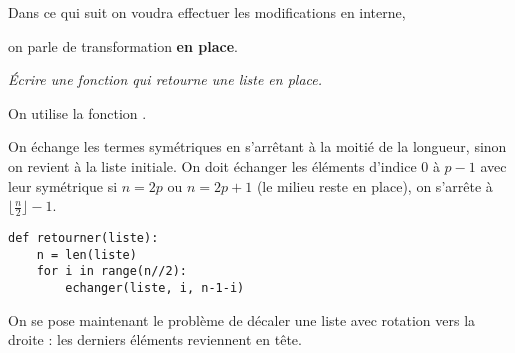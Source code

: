 Dans ce qui suit on voudra effectuer les modifications en interne, 

on parle de transformation {\bf en place}. 

\begin{Exercise}[title= Retourner une liste]\it
Écrire une fonction  qui retourne une liste en place.
\end{Exercise}
\begin{Answer}
On utilise la fonction .

On échange les termes symétriques en s'arrêtant à la moitié de la longueur, sinon on revient à la liste initiale. On doit échanger les éléments d'indice 0 à $p-1$ avec leur symétrique si $n=2p$ ou $n=2p+1$ (le milieu reste en place), on s'arrête à $\big\lfloor \frac n2 \bigr\rfloor - 1$.
\begin{lstlisting}
def retourner(liste):
    n = len(liste)
    for i in range(n//2): 
        echanger(liste, i, n-1-i)
\end{lstlisting}
\end{Answer}

\medskip

On se pose maintenant le problème de décaler une liste avec rotation vers la droite : les derniers éléments reviennent en tête.

